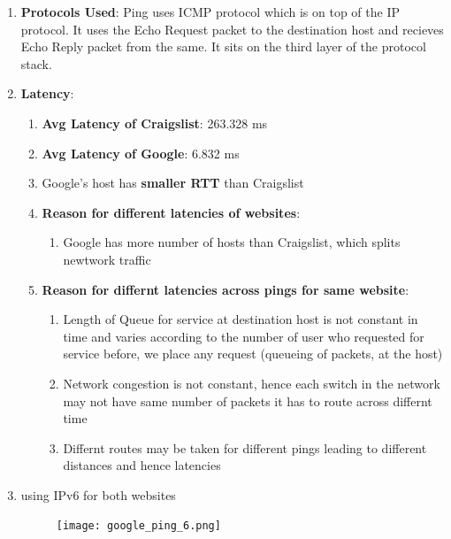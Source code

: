 \documentclass[12pt]{article}
\begin{document}
\begin{enumerate}
    \item \textbf{Protocols Used}: Ping uses ICMP protocol which is on top of the IP protocol. It uses the Echo Request packet to the destination host and recieves Echo Reply packet from the same. It sits on the third layer of the protocol stack.
    \item \textbf{Latency}:
    \begin{enumerate}
        \item \textbf{Avg Latency of Craigslist}: 263.328 ms
        \item \textbf{Avg Latency of Google}: 6.832 ms
        \item Google's host has \textbf{smaller RTT} than Craigslist
        \item \textbf{Reason for different latencies of websites}:
        \begin{enumerate}
            \item Google has more number of hosts than Craigslist, which splits newtwork traffic
        \end{enumerate}
        \item \textbf{Reason for differnt latencies across pings for same website}:
        \begin{enumerate}
            \item Length of Queue for service at destination host is not constant in time and varies according to the number of user who requested for service before, we place any request (queueing of packets, at the host)
            \item Network congestion is not constant, hence each switch in the network may not have same number of packets it has to route across differnt time
            \item Differnt routes may be taken for different pings leading to different distances and hence latencies
        \end{enumerate}
    \end{enumerate}
    \item using IPv6 for both websites
    \begin{figure}[h!]
        \centering
        \texttt{[image: google\_ping\_6.png]}

\end{figure}
\end{enumerate}
\end{document}
